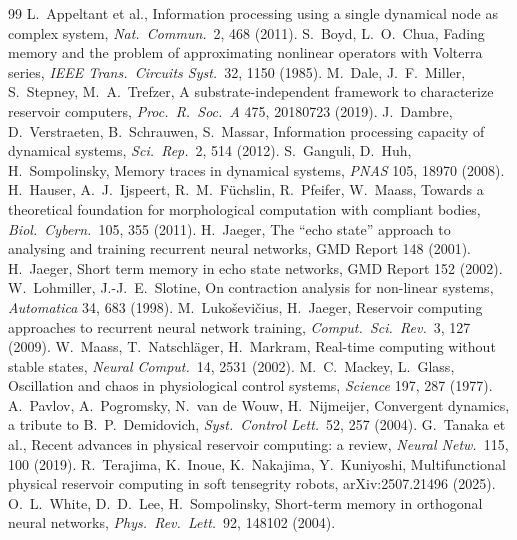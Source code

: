 \documentclass[10pt,a4paper]{article}
\begin{document}
\small
\begin{thebibliography}{99}\setlength{\itemsep}{0pt}
 L.~Appeltant et al., Information processing using a single dynamical node as complex system, \emph{Nat.\ Commun.}\ 2, 468 (2011).
 S.~Boyd, L.~O.~Chua, Fading memory and the problem of approximating nonlinear operators with Volterra series, \emph{IEEE Trans.\ Circuits Syst.}\ 32, 1150 (1985).
 M.~Dale, J.~F.~Miller, S.~Stepney, M.~A.~Trefzer, A substrate-independent framework to characterize reservoir computers, \emph{Proc.\ R.\ Soc.\ A} 475, 20180723 (2019).
 J.~Dambre, D.~Verstraeten, B.~Schrauwen, S.~Massar, Information processing capacity of dynamical systems, \emph{Sci.\ Rep.}\ 2, 514 (2012).
 S.~Ganguli, D.~Huh, H.~Sompolinsky, Memory traces in dynamical systems, \emph{PNAS} 105, 18970 (2008).
 H.~Hauser, A.~J.~Ijspeert, R.~M.~F\"uchslin, R.~Pfeifer, W.~Maass, Towards a theoretical foundation for morphological computation with compliant bodies, \emph{Biol.\ Cybern.}\ 105, 355 (2011).
 H.~Jaeger, The ``echo state'' approach to analysing and training recurrent neural networks, GMD Report 148 (2001).
 H.~Jaeger, Short term memory in echo state networks, GMD Report 152 (2002).
 W.~Lohmiller, J.-J.~E.~Slotine, On contraction analysis for non-linear systems, \emph{Automatica} 34, 683 (1998).
 M.~Luko\v{s}evi\v{c}ius, H.~Jaeger, Reservoir computing approaches to recurrent neural network training, \emph{Comput.\ Sci.\ Rev.}\ 3, 127 (2009).
 W.~Maass, T.~Natschl\"ager, H.~Markram, Real-time computing without stable states, \emph{Neural Comput.}\ 14, 2531 (2002).
 M.~C.~Mackey, L.~Glass, Oscillation and chaos in physiological control systems, \emph{Science} 197, 287 (1977).
 A.~Pavlov, A.~Pogromsky, N.~van de Wouw, H.~Nijmeijer, Convergent dynamics, a tribute to B.~P.~Demidovich, \emph{Syst.\ Control Lett.}\ 52, 257 (2004).
 G.~Tanaka et al., Recent advances in physical reservoir computing: a review, \emph{Neural Netw.}\ 115, 100 (2019).
 R.~Terajima, K.~Inoue, K.~Nakajima, Y.~Kuniyoshi, Multifunctional physical reservoir computing in soft tensegrity robots, arXiv:2507.21496 (2025).
 O.~L.~White, D.~D.~Lee, H.~Sompolinsky, Short-term memory in orthogonal neural networks, \emph{Phys.\ Rev.\ Lett.}\ 92, 148102 (2004).
\end{thebibliography}
\end{document}
